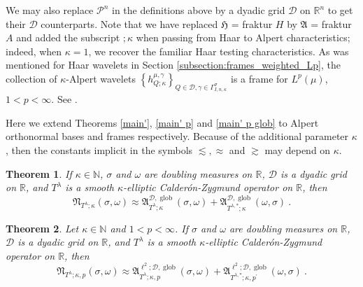 \documentclass{amsart}%
\newtheorem{theorem}{Theorem}
\theoremstyle{plain}
\numberwithin{equation}{section}
\begin{document}
We may also replace $\mathcal{P}^{n}$ in the definitions above by a dyadic
grid $\mathcal{D}$ on $\mathbb{R}^{n}$ to get their $\mathcal{D}$
counterparts. Note that we have replaced $\mathfrak{H}$ = fraktur $H$ by
$\mathfrak{A}$ = fraktur $A$ and added the subscript $;\kappa$ when passing
from Haar to Alpert characteristics; indeed, when $\kappa=1$, we recover the familiar Haar testing characteristics. As was mentioned for Haar wavelets in
Section \ref{subsection:frames_weighted_Lp}, the collection of $\kappa$-Alpert
wavelets $\left\{   h_{Q; \kappa}^{\mu, \gamma}\right\}  _{Q\in\mathcal{D},
\gamma\in\Gamma_{I,n ,\kappa} ^{\sigma}}$ is a frame for $L^{p}\left(
\mu\right)  $, $1<p<\infty$. See \cite{RaSaWi,SaWi}.

Here we extend Theorems \ref{main'}, \ref{main' p} and \ref{main' p glob} to Alpert
orthonormal bases and frames respectively. Because of the additional parameter $\kappa$, then the constants implicit in the symbols $\lesssim, \approx$ and $\gtrsim$ may depend on $\kappa$.
\begin{theorem}
\label{main' Alpert}If $\kappa\in\mathbb{N}$, $\sigma$ and $\omega$ are
doubling measures on $\mathbb{R}$, $\mathcal{D}$ is a dyadic grid on
$\mathbb{R}$, and $T^{\lambda}$ is a smooth $\kappa$-elliptic
Calder\'{o}n-Zygmund operator on $\mathbb{R}$, then%
\[
\mathfrak{N}_{T^{\lambda};\kappa}\left(  \sigma,\omega\right)  \approx
\mathfrak{A}_{T^{\lambda};\kappa}^{\mathcal{D},\operatorname*{glob}}\left(
\sigma,\omega\right)  +\mathfrak{A}_{T^{\lambda,\ast};\kappa}^{\mathcal{D}%
,\operatorname*{glob}}\left(  \omega,\sigma\right)  \ .
\]

\end{theorem}

\begin{theorem}
\label{main' p glob Alpert}Let $\kappa\in\mathbb{N}$ and $1<p<\infty$. If
$\sigma$ and $\omega$ are doubling measures on $\mathbb{R}$, $\mathcal{D}$ is
a dyadic grid on $\mathbb{R}$, and $T^{\lambda}$ is a smooth $\kappa$-elliptic
Calder\'{o}n-Zygmund operator on $\mathbb{R}$, then%
\[
\mathfrak{N}_{T^{\lambda};\kappa,p}\left(  \sigma,\omega\right)
\approx\mathfrak{A}_{T^{\lambda};\kappa,p}^{\ell^{2};\mathcal{D}%
,\operatorname*{glob}}\left(  \sigma,\omega\right)  +\mathfrak{A}%
_{T^{\lambda,\ast};\kappa,p^{\prime}}^{\ell^{2};\mathcal{D}%
,\operatorname*{glob}}\left(  \omega,\sigma\right)  \ .
\]
\end{theorem}
\end{document}
